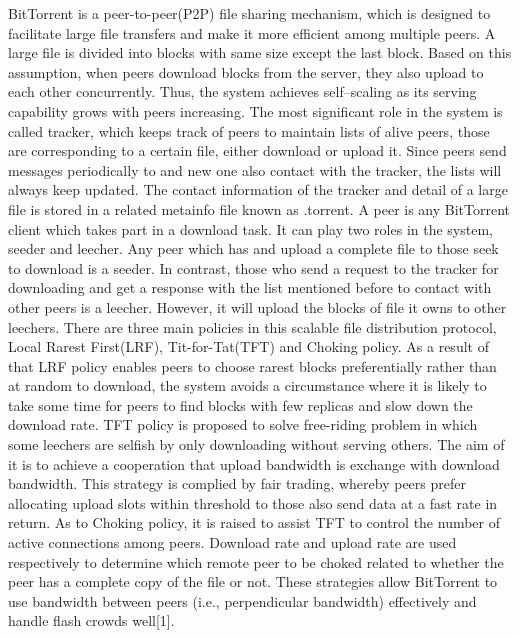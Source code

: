 \documentclass[conference]{IEEEtran}
\begin{document}
	BitTorrent is a peer-to-peer(P2P) file sharing mechanism, which is designed to facilitate large file transfers and make it more efficient among multiple peers. A large file is divided into blocks with same size except the last block. Based on this assumption, when peers download blocks from the server, they also upload to each other concurrently. Thus, the system achieves self–scaling as its serving capability grows with peers increasing. 
	The most significant role in the system is called tracker, which keeps track of peers to maintain lists of alive peers, those are corresponding to a certain file, either download or upload it. Since peers send messages periodically to and new one also contact with the tracker, the lists will always keep updated. The contact information of the tracker and detail of a large file is stored in a related metainfo file known as .torrent. A peer is any BitTorrent client which takes part in a download task. It can play two roles in the system, seeder and leecher. Any peer which has and upload a complete file to those seek to download is a seeder. In contrast, those who send a request to the tracker for downloading and get a response with the list mentioned before to contact with other peers is a leecher. However, it will upload the blocks of file it owns to other leechers.
	There are three main policies in this scalable file distribution protocol, Local Rarest First(LRF), Tit-for-Tat(TFT) and Choking policy. As a result of that LRF policy enables peers to choose rarest blocks preferentially rather than at random to download, the system avoids a circumstance where it is likely to take some time for peers to find blocks with few replicas and slow down the download rate. TFT policy is proposed to solve free-riding problem in which some leechers are selfish by only downloading without serving others. The aim of it is to achieve a cooperation that upload bandwidth is exchange with download bandwidth. This strategy is complied by fair trading, whereby peers prefer allocating upload slots within threshold to those also send data at a fast rate in return. As to Choking policy, it is raised to assist TFT to control the number of active connections among peers. Download rate and upload rate are used respectively to determine which remote peer to be choked related to whether the peer has a complete copy of the file or not. These strategies allow BitTorrent to use bandwidth between peers (i.e., perpendicular bandwidth) effectively and handle flash crowds well[1].
	
	
	
\end{document}
